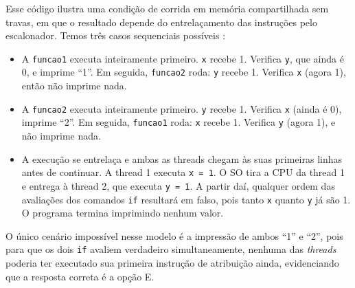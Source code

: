 \documentclass[12pt,a4paper]{article}
\begin{document}
Esse código ilustra uma condição de corrida em memória compartilhada sem travas,
em que o resultado depende do entrelaçamento das instruções pelo escalonador.
Temos três casos sequenciais possíveis \parencite[seç.~2.3]{tanenbaum2016}:
\begin{itemize}
    \item A \texttt{funcao1} executa inteiramente primeiro.
    \texttt{x} recebe 1.
    Verifica \texttt{y}, que ainda é 0, e imprime ``1''.
    Em seguida, \texttt{funcao2} roda: \texttt{y} recebe 1.
    Verifica \texttt{x} (agora 1), então não imprime nada.
    \item A \texttt{funcao2} executa inteiramente primeiro.
    \texttt{y} recebe 1.
    Verifica \texttt{x} (ainda é 0), imprime ``2''.
    Em seguida, \texttt{funcao1} roda: \texttt{x} recebe 1.
    Verifica \texttt{y} (agora 1), e não imprime nada.
    \item A execução se entrelaça e ambas as threads chegam às suas primeiras linhas antes de continuar.
    A thread 1 executa \texttt{x = 1}.
    O SO tira a CPU da thread 1 e entrega à thread 2, que executa \texttt{y = 1}.
    A partir daí, qualquer ordem das avaliações dos comandos \texttt{if} resultará em falso,
    pois tanto \texttt{x} quanto \texttt{y} já são 1.
    O programa termina imprimindo nenhum valor.
\end{itemize}

O único cenário impossível nesse modelo é a impressão de ambos ``1'' e ``2'',
pois para que os dois \texttt{if} avaliem verdadeiro simultaneamente,
nenhuma das \textit{threads} poderia ter executado sua primeira instrução de atribuição ainda,
evidenciando que a resposta correta é a opção E.
\end{document}
